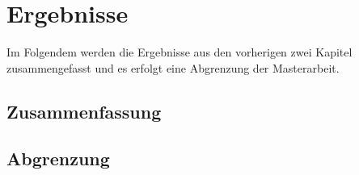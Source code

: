 \chapter{Ergebnisse}
\label{chapter:results}
Im Folgendem werden die Ergebnisse aus den vorherigen zwei Kapitel zusammengefasst und es erfolgt eine Abgrenzung der Masterarbeit.

\section{Zusammenfassung}

\section{Abgrenzung}

